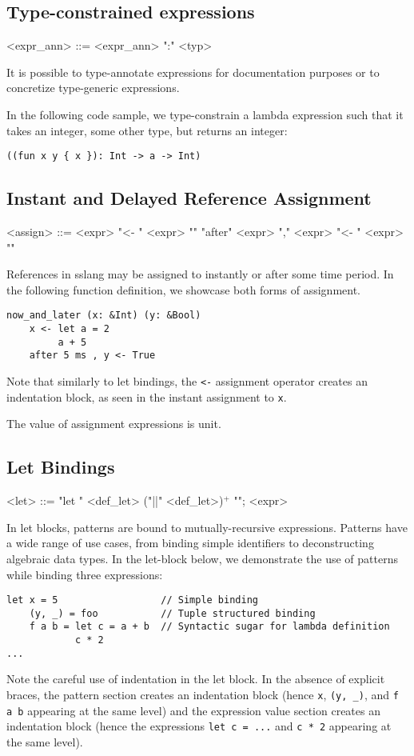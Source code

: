 \documentclass{article}
\begin{document}
\subsection{Type-constrained expressions}
\begin{grammar}
<expr_ann> ::= <expr_ann> ":" <typ>
\end{grammar}

It is possible to type-annotate expressions for documentation purposes or to concretize type-generic expressions.

In the following code sample, we type-constrain a lambda expression such that it takes an integer, some other type, but returns an integer:
\begin{lstlisting}
((fun x y { x }): Int -> a -> Int)
\end{lstlisting}

\subsection{Instant and Delayed Reference Assignment}
\begin{grammar}
<assign> ::= <expr> "<- {" <expr> "}"
\alt "after" <expr> "," <expr> "<- {" <expr> "}"
\end{grammar}
References in sslang may be assigned to instantly or after some time period. In the following function definition, we showcase both forms of assignment.
\begin{lstlisting}
now_and_later (x: &Int) (y: &Bool)
    x <- let a = 2
         a + 5
    after 5 ms , y <- True
\end{lstlisting}
Note that similarly to let bindings, the \texttt{<-} assignment operator creates an indentation block, as seen in the instant assignment to \texttt{x}.

The value of assignment expressions is unit.
\subsection{Let Bindings}
\begin{grammar}
<let> ::= "let {" <def_let> ("||" <def_let>)$^{+}$ "}"; <expr>
\end{grammar}

In let blocks, patterns are bound to mutually-recursive expressions. Patterns have a wide range of use cases, from binding simple identifiers to deconstructing algebraic data types. In the let-block below, we demonstrate the use of patterns while binding three expressions:
\begin{lstlisting}
let x = 5                  // Simple binding
    (y, _) = foo           // Tuple structured binding
    f a b = let c = a + b  // Syntactic sugar for lambda definition
            c * 2
...
\end{lstlisting}
Note the careful use of indentation in the let block. In the absence of explicit braces, the pattern section creates an indentation block (hence \texttt{x}, \texttt{(y, _)}, and \texttt{f a b} appearing at the same level) and the expression value section creates an indentation block (hence the expressions \texttt{let c = ...} and \texttt{c * 2} appearing at the same level).
\end{document}
